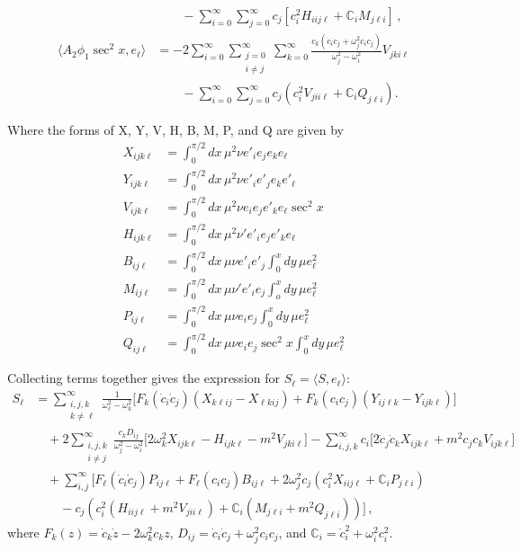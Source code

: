 \documentclass[letterpaper,11pt]{article}
\newcommand{\oi}{\omega_i}
\newcommand{\oj}{\omega_j}
\newcommand{\ok}{\omega_k}
\newcommand{\ol}{\omega_\ell}
\begin{document}
\begin{align}
%
& \qquad - \sum_{i=0}^\infty \sum_{j=0}^\infty c_j \left[ c_i^2 H_{iij\ell} + \mathbb C_i M_{j \ell i} \right] \, , \\
%
\langle A_2 \phi_1 \sec^2 x, e_\ell \rangle &= - 2\sum_{i = 0}^\infty \sum_{\substack{j=0 \\ i \neq j}}^\infty \sum_{k=0}^\infty \frac{c_k (\dot c_i \dot c_j + \oj^2 c_i c_j )}{\oj^2 - \oi^2} V_{jki\ell} \nonumber \\
& \qquad - \sum_{i=0}^\infty \sum_{j=0}^\infty c_j \left( c_i^2 V_{jii\ell} + \mathbb C_i Q_{j\ell i} \right) .
\end{align}

Where the forms of X, Y, V, H, B, M, P, and Q are given by
\begin{align}
X_{ijk\ell} &= \int^{\pi/2}_0 dx \, \mu^2 \nu e'_i e_j e_k e_\ell \\
Y_{ijk\ell} &= \int^{\pi/2}_0 dx \, \mu^2 \nu e'_i e'_j e_k e'_\ell \\
V_{ijk\ell} &= \int^{\pi/2}_0 dx \, \mu^2 \nu e_i e_j e'_k e_\ell \sec^2 x \\
H_{ijk\ell} &= \int^{\pi/2}_0 dx \, \mu^2 \nu' e'_i e_j e'_k e_\ell \\
B_{ij\ell} &= \int^{\pi/2}_0 dx \, \mu \nu e'_i e'_j \int^x_0 dy \, \mu e^2_\ell \\
M_{ij\ell} &= \int^{\pi/2}_0 dx \, \mu \nu' e'_i e_j \int^x_o dy \, \mu e_\ell^2 \\
P_{ij\ell} &= \int^{\pi/2}_0 dx \, \mu \nu e_i e_j \int^x_0 dy \, \mu e^2_\ell \\
Q_{ij\ell} &= \int^{\pi/2}_0 dx \, \mu \nu e_i e_j \sec^2 x \int^x_0 dy \, \mu e^2_\ell
\end{align}

Collecting terms together gives the expression for $S_\ell = \langle S, e_\ell \rangle$:
\begin{align}
S_\ell &= \sum_{\substack{i, j, k \\ k \neq \ell}}^\infty \frac{1}{\ol^2 - \ok^2} \Big[ F_k(\dot c_i \dot c_j) \left(X_{k\ell i j} - X_{\ell k i j} \right) + F_k(c_i c_j) \left(Y_{ij\ell k} - Y_{ijk\ell} \right) \Big] \nonumber \\
%
& \quad +2 \sum_{\substack{i,j,k \\ i \neq j}}^\infty \frac{c_k D_{ij}}{\oj^2 - \oi^2} \Big[  2\ok^2 X_{ijk\ell} - H_{ijk\ell} -m^2 V_{jki\ell} \Big] - \sum_{i,j,k}^\infty c_i \Big[ 2 \dot c_j \dot c_k X_{ijk\ell} + m^2 c_j c_k V_{ijk\ell} \Big] \nonumber \\ 
%
& \quad + \sum_{i,j}^\infty \Big[ F_\ell (\dot c_i \dot c_j) P_{ij\ell} + F_\ell (c_i c_j) B_{ij\ell} + 2\oj^2 c_j \left( c_i^2 X_{iij\ell} + \mathbb C_i P_{j\ell i} \right) \nonumber \\
%
& \qquad - c_j \left( c^2_i (H_{iij\ell} + m^2 V_{jii\ell} ) + \mathbb C_i (M_{j\ell i} + m^2 Q_{j\ell i}) \right) \Big] \, ,
\end{align}
where $F_k(z) = \dot c_k \dot z - 2\ok^2 c_k z$, $D_{ij} = \dot c_i \dot c_j + \omega^2_j c_i c_j$, and $\mathbb C_i = \dot c_i^2 + \oi^2 c_i^2$.
\end{document}
